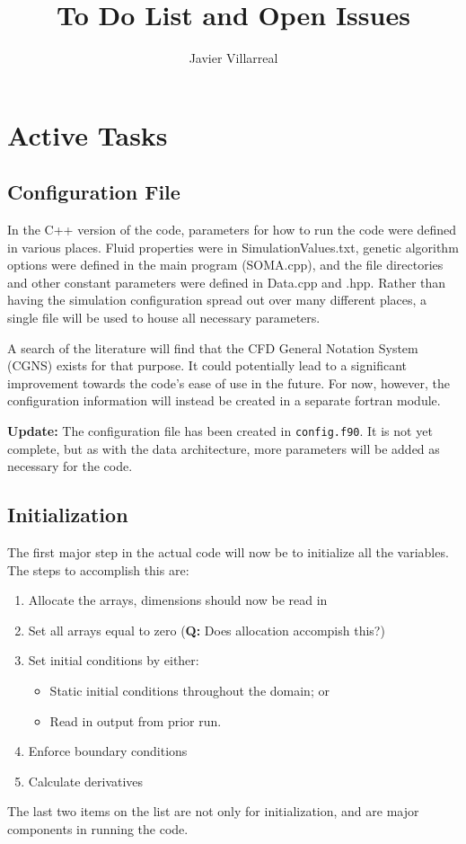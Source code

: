 \documentclass[12pt]{article}
\begin{document}
    \title{To Do List and Open Issues}
    \author{Javier Villarreal}
    \date{}
    \maketitle

    \section{Active Tasks}

    \subsection{Configuration File}
    In the C++ version of the code, parameters for how to run the code were defined in various places. Fluid properties were in SimulationValues.txt, genetic algorithm options were defined in the main program (SOMA.cpp), and the file directories and other constant parameters were defined in Data.cpp and .hpp. Rather than having the simulation configuration spread out over many different places, a single file will be used to house all necessary parameters. 

    A search of the literature will find that the CFD General Notation System (CGNS) exists for that purpose. It could potentially lead to a significant improvement towards the code's ease of use in the future. For now, however, the configuration information will instead be created in a separate fortran module.

    \textbf{Update:} The configuration file has been created in \texttt{config.f90}. It is not yet complete, but as with the data architecture, more parameters will be added as necessary for the code.

    \subsection{Initialization}
    The first major step in the actual code will now be to initialize all the variables. The steps to accomplish this are:
    \begin{enumerate}
        \item Allocate the arrays, dimensions should now be read in
        \item Set all arrays equal to zero (\textbf{Q:} Does allocation accompish this?)
        \item Set initial conditions by either:
        \begin{itemize}
            \item Static initial conditions throughout the domain; or
            \item Read in output from prior run.
        \end{itemize}
        \item Enforce boundary conditions
        \item Calculate derivatives
    \end{enumerate}
    The last two items on the list are not only for initialization, and are major components in running the code.
    
\end{document}
